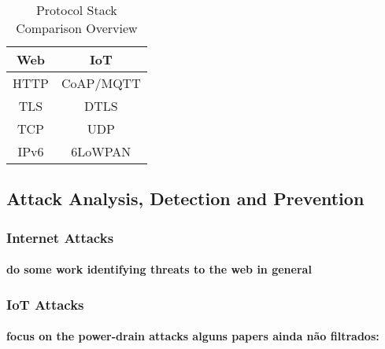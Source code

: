\begin{table}[h]
	\centering
	\begin{center} \caption{Protocol Stack Comparison Overview } \end{center}
	\label{tab:stack}
	\begin{tabular}{c|c}
		Web & IoT \\
		\hline
		\ac{HTTP} & \ac{CoAP}/\ac{MQTT} \\
		\ac{TLS} & \ac{DTLS} \\
		\ac{TCP} & \ac{UDP} \\
		IPv6 & 6LoWPAN 
	\end{tabular}
\end{table}

\subsection{Attack Analysis, Detection and Prevention}

\subsubsection{Internet Attacks}
\paragraph{
do some work identifying threats to the web in general
}
\subsubsection{IoT Attacks}
\paragraph{
	focus on the power-drain attacks
	alguns papers ainda não filtrados: \cite{Vasserman2013,Vanitha2014}
}
